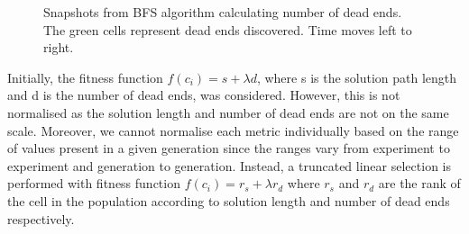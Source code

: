 \begin{figure}[!h]
\centering
            \hfill
            \hfill
            \hfill
            \hfill
            \caption{Snapshots from BFS algorithm calculating number of dead ends. The green cells represent dead ends discovered. Time moves left to right.}
\label{fig:dead-ends}
\end{figure}

Initially, the fitness function $f(c_i) = s + \lambda d$, where s is the solution path length and d is the number of dead ends, was considered. However, this is not normalised as the solution length and number of dead ends are not on the same scale. Moreover, we cannot normalise each metric individually based on the range of values present in a given generation since the ranges vary from experiment to experiment and generation to generation. Instead, a truncated linear selection is performed with fitness function $f(c_i) = r_s + \lambda r_d$ where $r_s$ and $r_d$ are the rank of the cell in the population according to solution length and number of dead ends respectively.